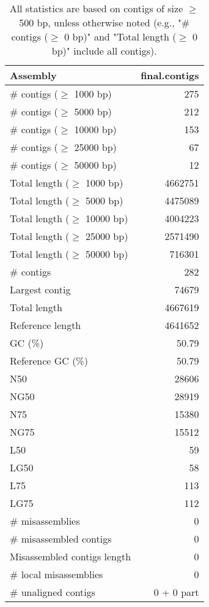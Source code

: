 \documentclass[12pt,a4paper]{article}
\begin{document}
\begin{table}[ht]
\begin{center}
\caption{All statistics are based on contigs of size $\geq$ 500 bp, unless otherwise noted (e.g., "\# contigs ($\geq$ 0 bp)" and "Total length ($\geq$ 0 bp)" include all contigs).}
\begin{tabular}{|l*{1}{|r}|}
\hline
Assembly & final.contigs \\ \hline
\# contigs ($\geq$ 1000 bp) & 275 \\ \hline
\# contigs ($\geq$ 5000 bp) & 212 \\ \hline
\# contigs ($\geq$ 10000 bp) & 153 \\ \hline
\# contigs ($\geq$ 25000 bp) & 67 \\ \hline
\# contigs ($\geq$ 50000 bp) & 12 \\ \hline
Total length ($\geq$ 1000 bp) & 4662751 \\ \hline
Total length ($\geq$ 5000 bp) & 4475089 \\ \hline
Total length ($\geq$ 10000 bp) & 4004223 \\ \hline
Total length ($\geq$ 25000 bp) & 2571490 \\ \hline
Total length ($\geq$ 50000 bp) & 716301 \\ \hline
\# contigs & 282 \\ \hline
Largest contig & 74679 \\ \hline
Total length & 4667619 \\ \hline
Reference length & 4641652 \\ \hline
GC (\%) & 50.79 \\ \hline
Reference GC (\%) & 50.79 \\ \hline
N50 & 28606 \\ \hline
NG50 & 28919 \\ \hline
N75 & 15380 \\ \hline
NG75 & 15512 \\ \hline
L50 & 59 \\ \hline
LG50 & 58 \\ \hline
L75 & 113 \\ \hline
LG75 & 112 \\ \hline
\# misassemblies & 0 \\ \hline
\# misassembled contigs & 0 \\ \hline
Misassembled contigs length & 0 \\ \hline
\# local misassemblies & 0 \\ \hline
\# unaligned contigs & 0 + 0 part \\ \hline

\end{tabular}
\end{center}
\end{table}
\end{document}
